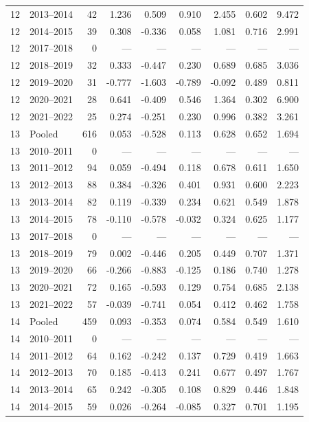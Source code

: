 \begin{longtable}{llrrrrrrr}
12 & 2013--2014 & 42 & 1.236 & 0.509 & 0.910 & 2.455 & 0.602 & 9.472 \\
12 & 2014--2015 & 39 & 0.308 & -0.336 & 0.058 & 1.081 & 0.716 & 2.991 \\
12 & 2017--2018 & 0 & --- & --- & --- & --- & --- & --- \\
12 & 2018--2019 & 32 & 0.333 & -0.447 & 0.230 & 0.689 & 0.685 & 3.036 \\
12 & 2019--2020 & 31 & -0.777 & -1.603 & -0.789 & -0.092 & 0.489 & 0.811 \\
12 & 2020--2021 & 28 & 0.641 & -0.409 & 0.546 & 1.364 & 0.302 & 6.900 \\
12 & 2021--2022 & 25 & 0.274 & -0.251 & 0.230 & 0.996 & 0.382 & 3.261 \\
13 & Pooled & 616 & 0.053 & -0.528 & 0.113 & 0.628 & 0.652 & 1.694 \\
13 & 2010--2011 & 0 & --- & --- & --- & --- & --- & --- \\
13 & 2011--2012 & 94 & 0.059 & -0.494 & 0.118 & 0.678 & 0.611 & 1.650 \\
13 & 2012--2013 & 88 & 0.384 & -0.326 & 0.401 & 0.931 & 0.600 & 2.223 \\
13 & 2013--2014 & 82 & 0.119 & -0.339 & 0.234 & 0.621 & 0.549 & 1.878 \\
13 & 2014--2015 & 78 & -0.110 & -0.578 & -0.032 & 0.324 & 0.625 & 1.177 \\
13 & 2017--2018 & 0 & --- & --- & --- & --- & --- & --- \\
13 & 2018--2019 & 79 & 0.002 & -0.446 & 0.205 & 0.449 & 0.707 & 1.371 \\
13 & 2019--2020 & 66 & -0.266 & -0.883 & -0.125 & 0.186 & 0.740 & 1.278 \\
13 & 2020--2021 & 72 & 0.165 & -0.593 & 0.129 & 0.754 & 0.685 & 2.138 \\
13 & 2021--2022 & 57 & -0.039 & -0.741 & 0.054 & 0.412 & 0.462 & 1.758 \\
14 & Pooled & 459 & 0.093 & -0.353 & 0.074 & 0.584 & 0.549 & 1.610 \\
14 & 2010--2011 & 0 & --- & --- & --- & --- & --- & --- \\
14 & 2011--2012 & 64 & 0.162 & -0.242 & 0.137 & 0.729 & 0.419 & 1.663 \\
14 & 2012--2013 & 70 & 0.185 & -0.413 & 0.241 & 0.677 & 0.497 & 1.767 \\
14 & 2013--2014 & 65 & 0.242 & -0.305 & 0.108 & 0.829 & 0.446 & 1.848 \\
14 & 2014--2015 & 59 & 0.026 & -0.264 & -0.085 & 0.327 & 0.701 & 1.195 \\

\end{longtable}
